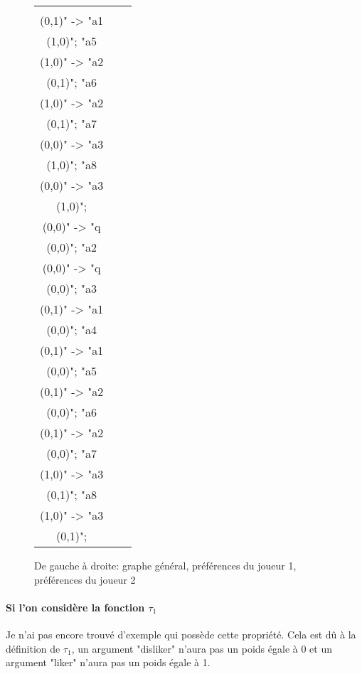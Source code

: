 \documentclass[12pt]{article}
\theoremstyle{defi}
\theoremstyle{not}
\theoremstyle{prob}
\begin{document}
\begin{figure}
\begin{tabular}{ccc}
\begin{tikzpicture}[>=stealth]
{              "a4\\ (0,1)" -> "a1\\ (1,0)";
              "a5\\ (1,0)" -> "a2\\ (0,1)";
              "a6\\ (1,0)" -> "a2\\ (0,1)";
              "a7\\ (0,0)" -> "a3\\ (1,0)";
              "a8\\ (0,0)" -> "a3\\ (1,0)";
              };
              \end{tikzpicture} &
              \begin{tikzpicture}[>=stealth]
              \graph [ layered layout, nodes = {scale=0.75, align=center} ] {
              "a1\\ (0,0)" -> "q\\ (0,0)";
              "a2\\ (0,0)" -> "q\\ (0,0)";
              "a3\\ (0,1)" -> "a1\\ (0,0)";
              "a4\\ (0,1)" -> "a1\\ (0,0)";
              "a5\\ (0,1)" -> "a2\\ (0,0)";
              "a6\\ (0,1)" -> "a2\\ (0,0)";
              "a7\\ (1,0)" -> "a3\\ (0,1)";
              "a8\\ (1,0)" -> "a3\\ (0,1)";
              };
              \end{tikzpicture} \\
            \end{tabular}

            \caption{De gauche à droite: graphe général, préférences du joueur 1, préférences du joueur 2}
            \label{fig:dif_pref}
          \end{figure}

        \paragraph{Si l'on considère la fonction $\tau_1$\\}
          Je n'ai pas encore trouvé d'exemple qui possède cette propriété.
          Cela est dû à la définition de $\tau_1$, un argument "disliker" n'aura pas un poids égale à 0 et un argument "liker" n'aura pas un poids égale à 1.
\end{document}
